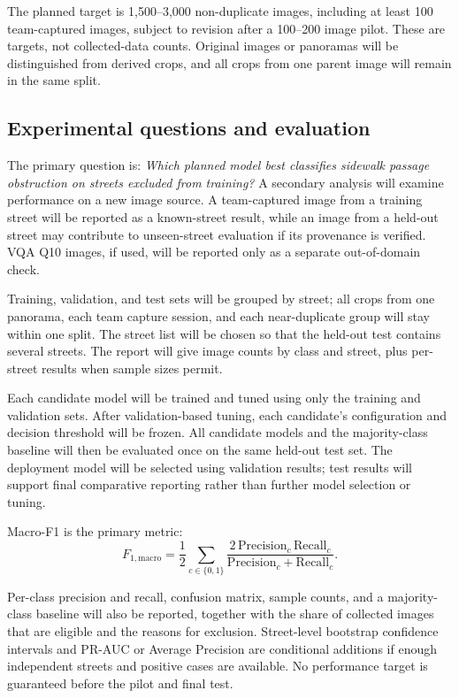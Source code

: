 The planned target is 1,500--3,000 non-duplicate images, including at least 100 team-captured images, subject to revision after a 100--200 image pilot. These are targets, not collected-data counts. Original images or panoramas will be distinguished from derived crops, and all crops from one parent image will remain in the same split.

\subsection{Experimental questions and evaluation}

The primary question is: \textit{Which planned model best classifies sidewalk passage obstruction on streets excluded from training?} A secondary analysis will examine performance on a new image source. A team-captured image from a training street will be reported as a known-street result, while an image from a held-out street may contribute to unseen-street evaluation if its provenance is verified. VQA Q10 images, if used, will be reported only as a separate out-of-domain check.

Training, validation, and test sets will be grouped by street; all crops from one panorama, each team capture session, and each near-duplicate group will stay within one split. The street list will be chosen so that the held-out test contains several streets. The report will give image counts by class and street, plus per-street results when sample sizes permit.

Each candidate model will be trained and tuned using only the training and validation sets. After validation-based tuning, each candidate's configuration and decision threshold will be frozen. All candidate models and the majority-class baseline will then be evaluated once on the same held-out test set. The deployment model will be selected using validation results; test results will support final comparative reporting rather than further model selection or tuning.

Macro-F1 is the primary metric:
\begin{equation}
  F_{1,\mathrm{macro}} = \frac{1}{2}\sum_{c\in\{0,1\}}
  \frac{2\,\mathrm{Precision}_c\,\mathrm{Recall}_c}{\mathrm{Precision}_c+\mathrm{Recall}_c}.
\end{equation}

Per-class precision and recall, confusion matrix, sample counts, and a majority-class baseline will also be reported, together with the share of collected images that are eligible and the reasons for exclusion. Street-level bootstrap confidence intervals and PR-AUC or Average Precision are conditional additions if enough independent streets and positive cases are available. No performance target is guaranteed before the pilot and final test.
